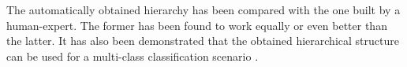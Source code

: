 The automatically obtained hierarchy has been compared with the one built by a human-expert. The former has been found to work equally or even better than the latter. It has also been demonstrated that the obtained hierarchical structure can be used for a multi-class classification scenario \parencite{malinen2014balanced}. 







